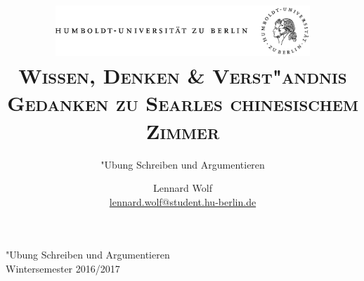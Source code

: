 \documentclass[a4paper, emulatestandardclasses, 12pt]{scrartcl}
\date{\vspace{-3ex}}
\begin{document}
\title{\vspace{5ex}
	\includegraphics*[width=0.72\textwidth]{images/hu_logo.png}\\
	\vspace{30pt}
	\scshape\LARGE{Wissen, Denken \& Verst"andnis\\Gedanken zu Searles chinesischem Zimmer}}
	
	\subtitle{\vspace{20pt}"Ubung Schreiben und Argumentieren\\
          }

\author{\vspace{-4pt}Lennard Wolf\\
        \small{\href{mailto:lennard.wolf@student.hu-berlin.de}{lennard.wolf@student.hu-berlin.de}}}      

\maketitle

\vspace{\fill}

\begin{minipage}[b]{\textwidth}
    \centering
    \onehalfspacing
    \large   
    "Ubung Schreiben und Argumentieren\\
    Wintersemester 2016/2017

    \vspace{-20mm} 
\end{minipage}%
\thispagestyle{empty}
\newpage
\clearpage
\setcounter{page}{1}
\end{document}
